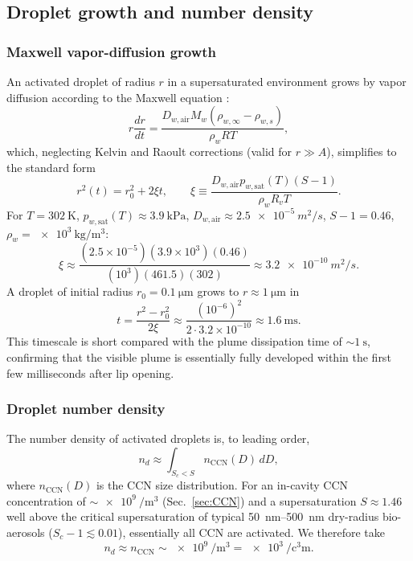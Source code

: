 \documentclass[11pt,a4paper]{article}
\newcommand{\pwsat}{p_{w,\text{sat}}}
\theoremstyle{definition}
\theoremstyle{plain}
\begin{document}
\subsection{Droplet growth and number density}

\subsubsection{Maxwell vapor-diffusion growth}
\label{sec:growth}

An activated droplet of radius $r$ in a supersaturated environment grows by vapor diffusion according to the Maxwell equation \citep{PruppacherKlett2010}:
\begin{equation}
\label{eq:maxwell}
r\frac{dr}{dt} = \frac{D_{w,\text{air}} M_w (\rho_{w,\infty} - \rho_{w,s})}{\rho_w R T},
\end{equation}
which, neglecting Kelvin and Raoult corrections (valid for $r \gg A$), simplifies to the standard form
\begin{equation}
\label{eq:r-grow}
r^2(t) = r_0^2 + 2\xi t, \qquad \xi \equiv \frac{D_{w,\text{air}} \pwsat(T)(S-1)}{\rho_w R_v T}.
\end{equation}
For $T = \SI{302}{\kelvin}$, $\pwsat(T) \approx \SI{3.9}{\kilo\pascal}$, $D_{w,\text{air}} \approx \SI{2.5e-5}{m^2/s}$, $S - 1 = 0.46$, $\rho_w = \SI{e3}{\kilo\gram\per\cubic\meter}$:
\begin{equation}
\xi \approx \frac{(2.5\times 10^{-5})(3.9\times 10^3)(0.46)}{(10^3)(461.5)(302)} \approx \SI{3.2e-10}{m^2/s}.
\end{equation}
A droplet of initial radius $r_0 = \SI{0.1}{\micro\meter}$ grows to $r \approx \SI{1}{\micro\meter}$ in
\begin{equation}
t = \frac{r^2 - r_0^2}{2\xi} \approx \frac{(10^{-6})^2}{2 \cdot 3.2 \times 10^{-10}} \approx \SI{1.6}{\milli\second}.
\end{equation}
This timescale is short compared with the plume dissipation time of $\sim\!\SI{1}{\second}$, confirming that the visible plume is essentially fully developed within the first few milliseconds after lip opening.

\subsubsection{Droplet number density}
The number density of activated droplets is, to leading order,
\begin{equation}
n_d \approx \int_{S_c < S} n_{\text{CCN}}(D)\, dD,
\end{equation}
where $n_{\text{CCN}}(D)$ is the CCN size distribution. For an in-cavity CCN concentration of $\sim\!\SI{e9}{\per\cubic\meter}$ (Sec.~\ref{sec:CCN}) and a supersaturation $S \approx 1.46$ well above the critical supersaturation of typical \SIrange{50}{500}{\nano\meter} dry-radius bio-aerosols ($S_c - 1 \lesssim 0.01$), essentially all CCN are activated. We therefore take
\begin{equation}
n_d \approx n_{\text{CCN}} \sim \SI{e9}{\per\cubic\meter} = \SI{e3}{\per\cubic\centi\meter}.
\end{equation}
\end{document}
